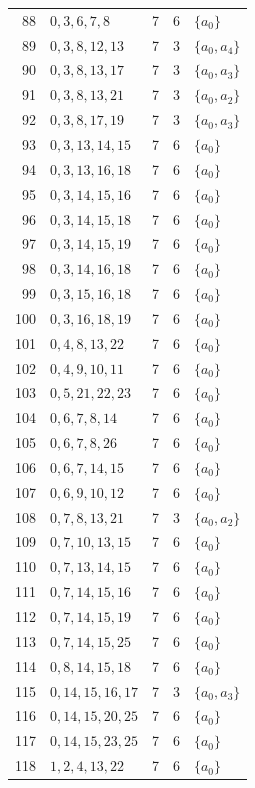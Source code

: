 \documentclass[10pt]{article}
\begin{document}
\begin{longtable}{@{}r l c c l@{}}
88 & $0,3,6,7,8$ & 7 & 6 & $\{a_{0}\}$\\
89 & $0,3,8,12,13$ & 7 & 3 & $\{a_{0},a_{4}\}$\\
90 & $0,3,8,13,17$ & 7 & 3 & $\{a_{0},a_{3}\}$\\
91 & $0,3,8,13,21$ & 7 & 3 & $\{a_{0},a_{2}\}$\\
92 & $0,3,8,17,19$ & 7 & 3 & $\{a_{0},a_{3}\}$\\
93 & $0,3,13,14,15$ & 7 & 6 & $\{a_{0}\}$\\
94 & $0,3,13,16,18$ & 7 & 6 & $\{a_{0}\}$\\
95 & $0,3,14,15,16$ & 7 & 6 & $\{a_{0}\}$\\
96 & $0,3,14,15,18$ & 7 & 6 & $\{a_{0}\}$\\
97 & $0,3,14,15,19$ & 7 & 6 & $\{a_{0}\}$\\
98 & $0,3,14,16,18$ & 7 & 6 & $\{a_{0}\}$\\
99 & $0,3,15,16,18$ & 7 & 6 & $\{a_{0}\}$\\
100 & $0,3,16,18,19$ & 7 & 6 & $\{a_{0}\}$\\
101 & $0,4,8,13,22$ & 7 & 6 & $\{a_{0}\}$\\
102 & $0,4,9,10,11$ & 7 & 6 & $\{a_{0}\}$\\
103 & $0,5,21,22,23$ & 7 & 6 & $\{a_{0}\}$\\
104 & $0,6,7,8,14$ & 7 & 6 & $\{a_{0}\}$\\
105 & $0,6,7,8,26$ & 7 & 6 & $\{a_{0}\}$\\
106 & $0,6,7,14,15$ & 7 & 6 & $\{a_{0}\}$\\
107 & $0,6,9,10,12$ & 7 & 6 & $\{a_{0}\}$\\
108 & $0,7,8,13,21$ & 7 & 3 & $\{a_{0},a_{2}\}$\\
109 & $0,7,10,13,15$ & 7 & 6 & $\{a_{0}\}$\\
110 & $0,7,13,14,15$ & 7 & 6 & $\{a_{0}\}$\\
111 & $0,7,14,15,16$ & 7 & 6 & $\{a_{0}\}$\\
112 & $0,7,14,15,19$ & 7 & 6 & $\{a_{0}\}$\\
113 & $0,7,14,15,25$ & 7 & 6 & $\{a_{0}\}$\\
114 & $0,8,14,15,18$ & 7 & 6 & $\{a_{0}\}$\\
115 & $0,14,15,16,17$ & 7 & 3 & $\{a_{0},a_{3}\}$\\
116 & $0,14,15,20,25$ & 7 & 6 & $\{a_{0}\}$\\
117 & $0,14,15,23,25$ & 7 & 6 & $\{a_{0}\}$\\
118 & $1,2,4,13,22$ & 7 & 6 & $\{a_{0}\}$\\

\end{longtable}
\end{document}
